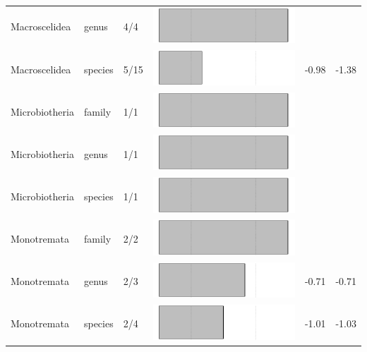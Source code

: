 \begin{longtable}{lL{1.8cm}C{2cm}lcc}
  Macroscelidea & genus & 4/4 & \includegraphics[width=0.20\linewidth, height=0.05\linewidth]{Missing_mammals/Table_figures/bar38.pdf} &   &   \\ 
  Macroscelidea & species & 5/15 & \includegraphics[width=0.20\linewidth, height=0.05\linewidth]{Missing_mammals/Table_figures/bar39.pdf} & -0.98 & -1.38 \\ 
  Microbiotheria & family & 1/1 & \includegraphics[width=0.20\linewidth, height=0.05\linewidth]{Missing_mammals/Table_figures/bar40.pdf} &   &   \\ 
  Microbiotheria & genus & 1/1 & \includegraphics[width=0.20\linewidth, height=0.05\linewidth]{Missing_mammals/Table_figures/bar41.pdf} &   &   \\ 
  Microbiotheria & species & 1/1 & \includegraphics[width=0.20\linewidth, height=0.05\linewidth]{Missing_mammals/Table_figures/bar42.pdf} &   &   \\ 
  Monotremata & family & 2/2 & \includegraphics[width=0.20\linewidth, height=0.05\linewidth]{Missing_mammals/Table_figures/bar43.pdf} &   &   \\ 
  Monotremata & genus & 2/3 & \includegraphics[width=0.20\linewidth, height=0.05\linewidth]{Missing_mammals/Table_figures/bar44.pdf} & -0.71 & -0.71 \\ 
  Monotremata & species & 2/4 & \includegraphics[width=0.20\linewidth, height=0.05\linewidth]{Missing_mammals/Table_figures/bar45.pdf} & -1.01 & -1.03 \\ 

\end{longtable}
